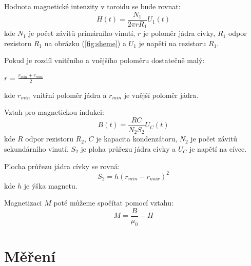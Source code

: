 \documentclass[a4paper,11pt]{article}
\begin{document}
\begin{minipage}[t]{0.5\textwidth}
            \captionsetup{justification=centering, font=footnotesize}
            \label{fig:sheme}
            \vspace{10pt}
            \raggedright
            Hodnota magnetické intenzity v toroidu se bude rovnat:
            \begin{equation}
                H(t) = \frac{N_1}{2 \pi r R_1} U_1(t)
            \end{equation}
            kde $N_1$ je počet závitů primárního vinutí, $r$ je poloměr jádra cívky, $R_1$ odpor rezistoru $R_1$ na obrázku (\ref{fig:sheme}) a $U_1$ je napětí na rezistoru $R_1$.
            \vspace{10pt}
    \end{minipage}
    \newpage
    \begin{minipage}[t]{0.5\textwidth} 
            \vspace{-50pt}
            Pokud je rozdíl vnitřního a vnějšího poloměru dostatečně malý:
            \begin{center}
                $r$ = $\frac{r_{min} + r_{max}}{2}$
            \end{center}
            kde $r_{min}$ vnitřní poloměr jádra a $r_{min}$ je vnější poloměr jádra.
            \vspace{10pt}
            \par Vztah pro magnetickou indukci:
            \begin{equation}
                B(t) = \frac{RC}{N_2 S_2} U_C(t)
            \end{equation}
            kde $R$ odpor rezistoru $R_2$, $C$ je kapacita kondenzátoru, $N_2$ je počet závitů sekundárního vinutí, $S_2$ je ploha průřezu jádra cívky a $U_C$ je napětí na cívce.
            \vspace{10pt}
            \par Plocha průřezu jádra cívky se rovná:
            \begin{equation}
                S_2 = h (r_{min} - r_{max})^2
            \end{equation}
            kde $h$ je ýška magnetu.
            \par Magnetizaci $M$ poté můžeme spočítat pomocí vztahu:
            \begin{equation}
                M = \frac{B}{\mu_0} - H
            \end{equation}
\section{Měření}  

\end{minipage}
\end{document}
